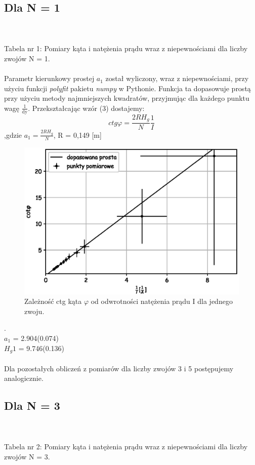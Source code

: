 \documentclass[a4paper,10pt]{article}
\begin{document}
\subsection{Dla N = 1}

\\
\\Tabela nr 1: Pomiary kąta i natężenia prądu wraz z niepewnościami dla liczby zwojów N = 1.
\\
\\Parametr kierunkowy prostej $a_1$ został wyliczony, wraz z niepewnościami, przy użyciu funkcji \emph{polyfit} pakietu \emph{numpy} w Pythonie. Funkcja ta
dopasowuje prostą przy użyciu metody najmniejszych kwadratów, przyjmując dla każdego punktu wagę $\frac{1}{\text{dy}}$. Przekształcając wzór (3) dostajemy:
\begin{equation}
ctg\varphi = \frac{2RH_g}{N}\frac{1}{I}
\end{equation}
,gdzie $a_1=\frac{2RH_g}{N}$, R = 0,149 [m]

\begin{figure}[H]
  \includegraphics{./wykres_1.eps}
  \renewcommand*{\figurename}{Wykres nr} 
  \caption{Zależność ctg kąta $\varphi$ od odwrotności natężenia prądu I dla jednego zwoju.}
  \label{}
\end{figure}.
\\$a_1$ = 2.904(0.074)\\
$H_g1$ = 9.746(0.136)\\
\\Dla pozostałych obliczeń z pomiarów dla liczby zwojów 3 i 5 postępujemy analogicznie.

\subsection{Dla N = 3}

\\
\\Tabela nr 2: Pomiary kąta i natężenia prądu wraz z niepewnościami dla liczby zwojów N = 3.
\end{document}
